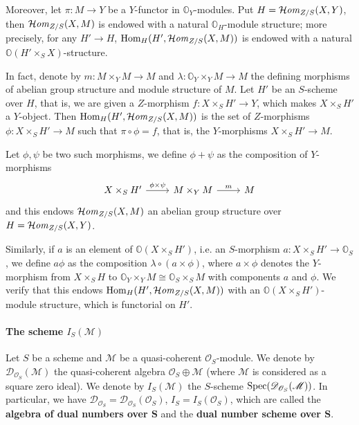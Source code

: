 \begin{remark}\label{category of presheaf functor Hom module structure}
Moreover, let $\pi:M\to Y$ be a $Y$-functor in $\mathbb{O}_Y$-modules. Put $H=\operatorname{\mathcal{H}\hspace*{-0.4pt}\textit{om}\hspace{0.5pt}}_{Z/S}(X,Y)$, then $\operatorname{\mathcal{H}\hspace*{-0.4pt}\textit{om}\hspace{0.5pt}}_{Z/S}(X,M)$ is endowed with a natural $\mathbb{O}_H$-module structure; more precisely, for any $H'\to H$, $\mathrm{Hom}_H(H',\operatorname{\mathcal{H}\hspace*{-0.4pt}\textit{om}\hspace{0.5pt}}_{Z/S}(X,M))$ is endowed with a natural $\mathbb{O}(H'\times_SX)$-structure.\par
In fact, denote by $m:M\times_YM\to M$ and $\lambda:\mathbb{O}_Y\times_YM\to M$ the defining morphisms of abelian group structure and module structure of $M$. Let $H'$ be an $S$-scheme over $H$, that is, we are given a $Z$-morphism $f:X\times_SH'\to Y$, which makes $X\times_SH'$ a $Y$-object. Then $\mathrm{Hom}_H(H',\operatorname{\mathcal{H}\hspace*{-0.4pt}\textit{om}\hspace{0.5pt}}_{Z/S}(X,M))$ is the set of $Z$-morphisms $\phi:X\times_SH'\to M$ such that $\pi\circ\phi=f$, that is, the $Y$-morphisms $X\times_SH'\to M$.\par
Let $\phi,\psi$ be two such morphisms, we define $\phi+\psi$ as the composition of $Y$-morphisms
\[\begin{tikzcd}
X\times_SH'\ar[r,"\phi\times\psi"]&M\times_YM\ar[r,"m"]&M
\end{tikzcd}\]
and this endows $\operatorname{\mathcal{H}\hspace*{-0.4pt}\textit{om}\hspace{0.5pt}}_{Z/S}(X,M)$ an abelian group structure over $H=\operatorname{\mathcal{H}\hspace*{-0.4pt}\textit{om}\hspace{0.5pt}}_{Z/S}(X,Y)$.\par
Similarly, if $a$ is an element of $\mathbb{O}(X\times_SH')$, i.e. an $S$-morphism $a:X\times_SH'\to\mathbb{O}_S$, we define $a\phi$ as the composition $\lambda\circ(a\times\phi)$, where $a\times\phi$ denotes the $Y$-morphism from $X\times_SH$ to $\mathbb{O}_Y\times_YM\cong\mathbb{O}_S\times_SM$ with components $a$ and $\phi$. We verify that this endows $\mathrm{Hom}_H(H',\operatorname{\mathcal{H}\hspace*{-0.4pt}\textit{om}\hspace{0.5pt}}_{Z/S}(X,M))$ with an $\mathbb{O}(X\times_SH')$-module structure, which is functorial on $H'$.
\end{remark}

\paragraph{The scheme \texorpdfstring{$I_S(\mathscr{M})$}{I}}\label{scheme tangent bundle I_S paragraph}
\begin{definition}
Let $S$ be a scheme and $\mathscr{M}$ be a quasi-coherent $\mathscr{O}_S$-module. We denote by $\mathscr{D}_{\mathscr{O}_S}(\mathscr{M})$ the quasi-coherent algebra $\mathscr{O}_S\oplus\mathscr{M}$ (where $\mathscr{M}$ is considered as a square zero ideal). We denote by $I_S(\mathscr{M})$ the $S$-scheme $\mathrm{Spec}(\mathscr{D}_{\mathscr{O}_S}(\mathscr{M}))$. In particular, we have $\mathscr{D}_{\mathscr{O}_S}=\mathscr{D}_{\mathscr{O}_S}(\mathscr{O}_S)$, $I_S=I_S(\mathscr{O}_S)$, which are called the \textbf{algebra of dual numbers over $\bm{S}$} and the \textbf{dual number scheme over $\bm{S}$}.
\end{definition}

